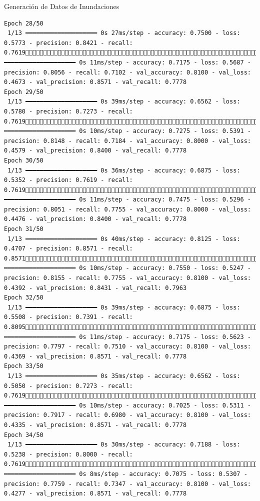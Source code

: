\documentclass[
  ignorenonframetext,
]{beamer}
\begin{document}
\begin{frame}[fragile]{Generación de Datos de Inundaciones}
\begin{verbatim}
Epoch 28/50
 1/13 ━━━━━━━━━━━━━━━━━━━━ 0s 27ms/step - accuracy: 0.7500 - loss: 0.5773 - precision: 0.8421 - recall: 0.761913/13 ━━━━━━━━━━━━━━━━━━━━ 0s 11ms/step - accuracy: 0.7175 - loss: 0.5687 - precision: 0.8056 - recall: 0.7102 - val_accuracy: 0.8100 - val_loss: 0.4673 - val_precision: 0.8571 - val_recall: 0.7778
Epoch 29/50
 1/13 ━━━━━━━━━━━━━━━━━━━━ 0s 39ms/step - accuracy: 0.6562 - loss: 0.5780 - precision: 0.7273 - recall: 0.761913/13 ━━━━━━━━━━━━━━━━━━━━ 0s 10ms/step - accuracy: 0.7275 - loss: 0.5391 - precision: 0.8148 - recall: 0.7184 - val_accuracy: 0.8000 - val_loss: 0.4579 - val_precision: 0.8400 - val_recall: 0.7778
Epoch 30/50
 1/13 ━━━━━━━━━━━━━━━━━━━━ 0s 36ms/step - accuracy: 0.6875 - loss: 0.5352 - precision: 0.7619 - recall: 0.761913/13 ━━━━━━━━━━━━━━━━━━━━ 0s 11ms/step - accuracy: 0.7475 - loss: 0.5296 - precision: 0.8051 - recall: 0.7755 - val_accuracy: 0.8000 - val_loss: 0.4476 - val_precision: 0.8400 - val_recall: 0.7778
Epoch 31/50
 1/13 ━━━━━━━━━━━━━━━━━━━━ 0s 40ms/step - accuracy: 0.8125 - loss: 0.4707 - precision: 0.8571 - recall: 0.857113/13 ━━━━━━━━━━━━━━━━━━━━ 0s 10ms/step - accuracy: 0.7550 - loss: 0.5247 - precision: 0.8155 - recall: 0.7755 - val_accuracy: 0.8100 - val_loss: 0.4392 - val_precision: 0.8431 - val_recall: 0.7963
Epoch 32/50
 1/13 ━━━━━━━━━━━━━━━━━━━━ 0s 39ms/step - accuracy: 0.6875 - loss: 0.5508 - precision: 0.7391 - recall: 0.809513/13 ━━━━━━━━━━━━━━━━━━━━ 0s 11ms/step - accuracy: 0.7175 - loss: 0.5623 - precision: 0.7797 - recall: 0.7510 - val_accuracy: 0.8100 - val_loss: 0.4369 - val_precision: 0.8571 - val_recall: 0.7778
Epoch 33/50
 1/13 ━━━━━━━━━━━━━━━━━━━━ 0s 35ms/step - accuracy: 0.6562 - loss: 0.5050 - precision: 0.7273 - recall: 0.761913/13 ━━━━━━━━━━━━━━━━━━━━ 0s 10ms/step - accuracy: 0.7025 - loss: 0.5311 - precision: 0.7917 - recall: 0.6980 - val_accuracy: 0.8100 - val_loss: 0.4335 - val_precision: 0.8571 - val_recall: 0.7778
Epoch 34/50
 1/13 ━━━━━━━━━━━━━━━━━━━━ 0s 30ms/step - accuracy: 0.7188 - loss: 0.5238 - precision: 0.8000 - recall: 0.761913/13 ━━━━━━━━━━━━━━━━━━━━ 0s 8ms/step - accuracy: 0.7075 - loss: 0.5307 - precision: 0.7759 - recall: 0.7347 - val_accuracy: 0.8100 - val_loss: 0.4277 - val_precision: 0.8571 - val_recall: 0.7778

\end{verbatim}
\end{frame}
\end{document}
